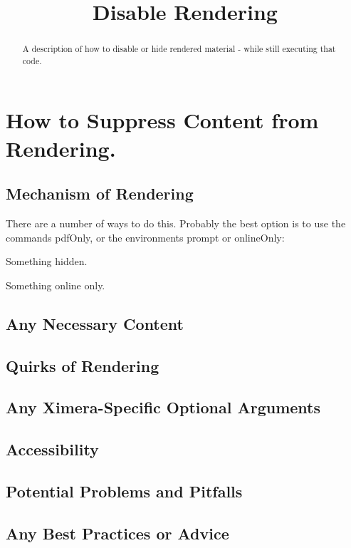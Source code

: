 \documentclass{ximera}
\title{Disable Rendering}
\begin{document}
\begin{abstract}
    A description of how to disable or hide rendered material - while still executing that code.
\end{abstract}
\maketitle
   
\section*{How to Suppress Content from Rendering.}
    \subsection*{Mechanism of Rendering}
        
        There are a number of ways to do this. Probably the best option is to use the commands pdfOnly, or the environments prompt or onlineOnly:

        \begin{prompt}  
          Something hidden.
        \end{prompt}
        \begin{onlineOnly}
          Something online only.
        \end{onlineOnly}
    
    
    \subsection*{Any Necessary Content}
    
    
    
    \subsection*{Quirks of Rendering}
    
    
    
    \subsection*{Any Ximera-Specific Optional Arguments}
    
    
    
    \subsection*{Accessibility}
    
    
    
    \subsection*{Potential Problems and Pitfalls}
    
    
    
    \subsection*{Any Best Practices or Advice}
    
    
    
\end{document}
